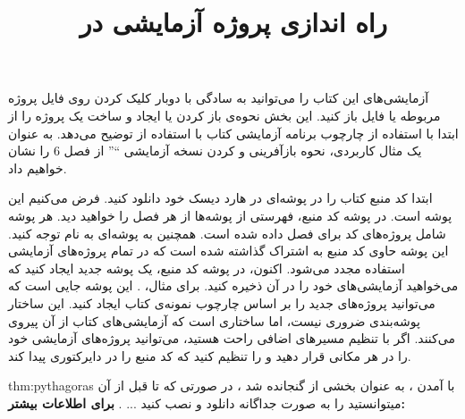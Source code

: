 
\title{
    \huge
    \hspace{-40pt}
    \textbf{راه اندازی پروژه آزمایشی در }
}  \rullFillWithLine[0.5em]{1pt}
\textbf{\vspace{7pt}}

{
    \Large
    \begin{spacing}{1.5}
        آزمایشی‌های این کتاب را می‌توانید به سادگی با دوبار کلیک کردن روی فایل پروژه مربوطه  یا فایل  باز کنید.
        این بخش نحوه‌ی باز کردن یا ایجاد و ساخت یک پروژه را از ابتدا با استفاده از چارچوب برنامه آزمایشی کتاب با استفاده از  توضیح می‌دهد.
        به عنوان یک مثال کاربردی، نحوه بازآفرینی و  کردن نسخه آزمایشی \enquote{} از فصل 6 را نشان خواهیم داد.
    \end{spacing}
}

\textbf{\vspace{-30pt}}
\title{
    \LARGE
}
\textbf{\vspace{-10pt}}

{
    \Large
    \begin{spacing}{1.5}
        ابتدا کد منبع کتاب را در پوشه‌ای در هارد دیسک خود دانلود کنید.
        فرض می‌کنیم این پوشه  است.
        در پوشه کد منبع، فهرستی از پوشه‌ها از هر فصل را خواهید دید. هر پوشه شامل پروژه‌های کد برای فصل داده شده است.
        همچنین به پوشه‌ای به نام  توجه کنید. این پوشه حاوی کد منبع به اشتراک گذاشته شده است که در تمام پروژه‌های آزمایشی استفاده مجدد می‌شود.
        اکنون، در پوشه کد منبع، یک پوشه جدید ایجاد کنید که می‌خواهید آزمایشی‌های خود را در آن ذخیره کنید.
        برای مثال، . این پوشه جایی است که می‌توانید پروژه‌های جدید را بر اساس چارچوب نمونه‌ی کتاب ایجاد کنید.
        این ساختار پوشه‌بندی ضروری نیست، اما ساختاری است که آزمایشی‌های کتاب از آن پیروی می‌کنند. اگر با تنظیم مسیر‌های اضافی راحت هستید، می‌توانید پروژه‌های آزمایشی خود را در هر مکانی قرار دهید و  را تنظیم کنید که کد منبع را در دایرکتوری  پیدا کند.
    \end{spacing}
}

\begin{point}{thm:pythagoras}
    \Large
    با آمدن ،  به عنوان بخشی از  گنجانده شد ، در صورتی که تا قبل از آن میتوانستید  را به صورت جداگانه دانلود و نصب کنید ... .
    \textbf{برای اطلاعات بیشتر:} \href{https://learn.microsoft.com/en-us/windows/win32/directx-sdk--august-2009-}{}
\end{point}

